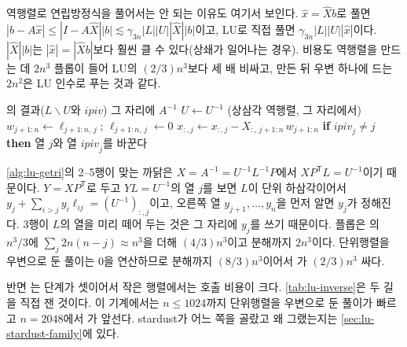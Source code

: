 역행렬로 연립방정식을 풀어서는 안 되는 이유도 여기서 보인다. $\hat x=\hat Xb$로 풀면 $|b-A\hat x|\le|I-A\hat X||b|\lesssim\gamma_{3n}|L||U||\hat X||b|$이고, LU로 직접 풀면 $\gamma_{3n}|L||U||\hat x|$이다. $|\hat X||b|$는 $|\hat x|=|\hat Xb|$보다 훨씬 클 수 있다(상쇄가 일어나는 경우). 비용도 역행렬을 만드는 데 $2n^3$ 플롭이 들어 LU의 $(2/3)n^3$보다 세 배 비싸고, 만든 뒤 우변 하나에 드는 $2n^2$은 LU 인수로 푸는 것과 같다.

\begin{algorithm}[t]
\begin{algorithmic}[1]
\Require {}의 결과($L\backslash U$와 $\mathit{ipiv}$)
\Ensure 그 자리에 $A^{-1}$
\State $U\gets U^{-1}$ (상삼각 역행렬, 그 자리에서) 
 
  \State $w_{j+1:n}\gets\ell_{j+1:n,\,j}$; $\ell_{j+1:n,\,j}\gets0$
  \State $x_{:,j}\gets x_{:,j}-X_{:,\,j+1:n}\,w_{j+1:n}$ 
\EndFor
{} 
  \State \textbf{if} $\mathit{ipiv}_j\ne j$ \textbf{then} 열 $j$와 열 $\mathit{ipiv}_j$를 바꾼다
\EndFor
\end{algorithmic}
\caption{인수에서 역행렬 (LAPACK 의 블록 없는 꼴)}
\label{alg:lu-getri}
\end{algorithm}

\cref{alg:lu-getri}의 2--5행이 맞는 까닭은 $X=A^{-1}=U^{-1}L^{-1}P$에서 $XP^{\mathsf T}L=U^{-1}$이기 때문이다. $Y=XP^{\mathsf T}$로 두고 $YL=U^{-1}$의 열 $j$를 보면 $L$이 단위 하삼각이어서 $y_j+\sum_{i>j}y_i\ell_{ij}=(U^{-1})_{:,j}$이고, 오른쪽 열 $y_{j+1},\dots,y_n$을 먼저 알면 $y_j$가 정해진다. 3행이 $L$의 열을 미리 떼어 두는 것은 그 자리에 $y_j$를 쓰기 때문이다. 플롭은 의 $n^3/3$에 $\sum_j2n(n-j)\approx n^3$을 더해 $(4/3)n^3$이고 분해까지 $2n^3$이다. 단위행렬을 우변으로 둔 풀이는 $0$을 연산하므로 분해까지 $(8/3)n^3$이어서 가 $(2/3)n^3$ 싸다.

반면 는 단계가 셋이어서 작은 행렬에서는 호출 비용이 크다. \cref{tab:lu-inverse}은 두 길을 직접 잰 것이다. 이 기계에서는 $n\le1024$까지 단위행렬을 우변으로 둔 풀이가 빠르고 $n=2048$에서 가 앞선다. stardust가 어느 쪽을 골랐고 왜 그랬는지는 \cref{sec:lu-stardust-family}에 있다.

